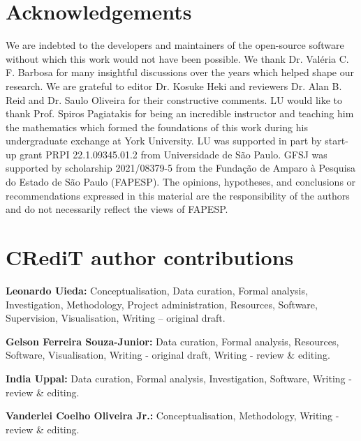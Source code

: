 \section*{Acknowledgements}

We are indebted to the developers and maintainers of the open-source software
without which this work would not have been possible.
We thank Dr. Valéria C. F. Barbosa for many insightful discussions over the
years which helped shape our research.
We are grateful to editor Dr. Kosuke Heki and reviewers Dr. Alan B. Reid and
Dr. Saulo Oliveira for their constructive comments.
LU would like to thank Prof. Spiros Pagiatakis for being an incredible
instructor and teaching him the mathematics which formed the foundations of
this work during his undergraduate exchange at York University.
LU was supported in part by start-up grant PRPI 22.1.09345.01.2 from
Universidade de São Paulo.
GFSJ was supported by scholarship 2021/08379-5 from the Fundação de Amparo
à Pesquisa do Estado de São Paulo (FAPESP).
The opinions, hypotheses, and conclusions or recommendations expressed in this
material are the responsibility of the authors and do not necessarily reflect
the views of FAPESP.

\section*{CRediT author contributions}

\textbf{Leonardo Uieda:} Conceptualisation, Data curation, Formal analysis,
Investigation, Methodology, Pro\-ject administration, Resources, Software,
Supervision, Visualisation, Writing – original draft.

\noindent
\textbf{Gelson Ferreira Souza-Junior:} Data curation, Formal analysis,
Resources, Software, Visualisation, Writing - original draft, Writing - review
\& editing.

\noindent
\textbf{India Uppal:} Data curation, Formal analysis, Investigation, Software,
Writing - review \& editing.

\noindent
\textbf{Vanderlei Coelho Oliveira Jr.:} Conceptualisation, Methodology, Writing
- review \& editing.
